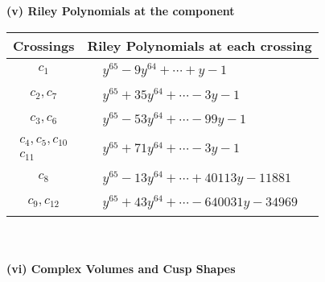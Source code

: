 \documentclass[1p]{elsarticle_modified}
\theoremstyle{definition}
\begin{document}
\newpage\renewcommand{\arraystretch}{1}
\flushleft \textbf{(v) Riley Polynomials at the component}\newline \\
\begin{tabular}{m{50pt}|m{274pt}}
Crossings & \hspace{64pt}Riley Polynomials at each crossing \\
\hline $$\begin{aligned}c_{1}\end{aligned}$$&$\begin{aligned}
&y^{65}-9 y^{64}+\cdots+y-1
\end{aligned}$\\
\hline $$\begin{aligned}c_{2},c_{7}\end{aligned}$$&$\begin{aligned}
&y^{65}+35 y^{64}+\cdots-3 y-1
\end{aligned}$\\
\hline $$\begin{aligned}c_{3},c_{6}\end{aligned}$$&$\begin{aligned}
&y^{65}-53 y^{64}+\cdots-99 y-1
\end{aligned}$\\
\hline $$\begin{aligned}c_{4},c_{5},c_{10}\\c_{11}\end{aligned}$$&$\begin{aligned}
&y^{65}+71 y^{64}+\cdots-3 y-1
\end{aligned}$\\
\hline $$\begin{aligned}c_{8}\end{aligned}$$&$\begin{aligned}
&y^{65}-13 y^{64}+\cdots+40113 y-11881
\end{aligned}$\\
\hline $$\begin{aligned}c_{9},c_{12}\end{aligned}$$&$\begin{aligned}
&y^{65}+43 y^{64}+\cdots-640031 y-34969
\end{aligned}$\\
\hline
\end{tabular}\\~\\
\newpage\flushleft \textbf{(vi) Complex Volumes and Cusp Shapes}
\end{document}
